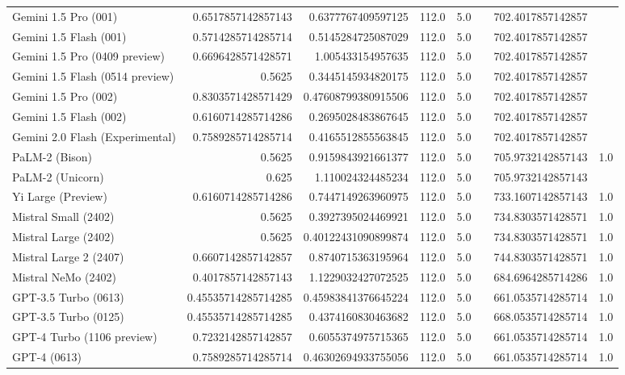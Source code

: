 \begin{table}[htp]
{\begin{tabular}{lrrrrrrr}
Gemini 1.5 Pro (001) & 0.6517857142857143 & 0.6377767409597125 & 112.0 & 5.0 &  & 702.4017857142857 &  \\
Gemini 1.5 Flash (001) & 0.5714285714285714 & 0.5145284725087029 & 112.0 & 5.0 &  & 702.4017857142857 &  \\
Gemini 1.5 Pro (0409 preview) & 0.6696428571428571 & 1.005433154957635 & 112.0 & 5.0 &  & 702.4017857142857 &  \\
Gemini 1.5 Flash (0514 preview) & 0.5625 & 0.3445145934820175 & 112.0 & 5.0 &  & 702.4017857142857 &  \\
Gemini 1.5 Pro (002) & 0.8303571428571429 & 0.47608799380915506 & 112.0 & 5.0 &  & 702.4017857142857 &  \\
Gemini 1.5 Flash (002) & 0.6160714285714286 & 0.2695028483867645 & 112.0 & 5.0 &  & 702.4017857142857 &  \\
Gemini 2.0 Flash (Experimental) & 0.7589285714285714 & 0.4165512855563845 & 112.0 & 5.0 &  & 702.4017857142857 &  \\
PaLM-2 (Bison) & 0.5625 & 0.9159843921661377 & 112.0 & 5.0 &  & 705.9732142857143 & 1.0 \\
PaLM-2 (Unicorn) & 0.625 & 1.110024324485234 & 112.0 & 5.0 &  & 705.9732142857143 &  \\
Yi Large (Preview) & 0.6160714285714286 & 0.7447149263960975 & 112.0 & 5.0 &  & 733.1607142857143 & 1.0 \\
Mistral Small (2402) & 0.5625 & 0.3927395024469921 & 112.0 & 5.0 &  & 734.8303571428571 & 1.0 \\
Mistral Large (2402) & 0.5625 & 0.40122431090899874 & 112.0 & 5.0 &  & 734.8303571428571 & 1.0 \\
Mistral Large 2 (2407) & 0.6607142857142857 & 0.8740715363195964 & 112.0 & 5.0 &  & 744.8303571428571 & 1.0 \\
Mistral NeMo (2402) & 0.4017857142857143 & 1.1229032427072525 & 112.0 & 5.0 &  & 684.6964285714286 & 1.0 \\
GPT-3.5 Turbo (0613) & 0.45535714285714285 & 0.45983841376645224 & 112.0 & 5.0 &  & 661.0535714285714 & 1.0 \\
GPT-3.5 Turbo (0125) & 0.45535714285714285 & 0.4374160830463682 & 112.0 & 5.0 &  & 668.0535714285714 & 1.0 \\
GPT-4 Turbo (1106 preview) & 0.7232142857142857 & 0.6055374975715365 & 112.0 & 5.0 &  & 661.0535714285714 & 1.0 \\
GPT-4 (0613) & 0.7589285714285714 & 0.46302694933755056 & 112.0 & 5.0 &  & 661.0535714285714 & 1.0 \\

\end{tabular}}
\end{table}

